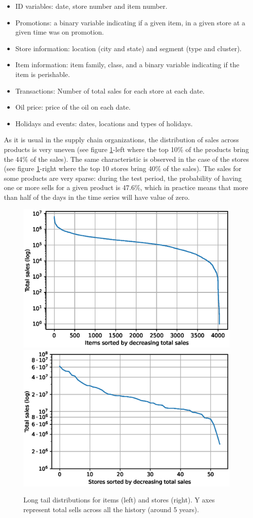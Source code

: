\documentclass{elsarticle}
\begin{document}
	\begin{itemize}
		\item ID variables: date, store number and item number.
		\item Promotions: a binary variable indicating if a given item, in a given store at a given time was on promotion.
		\item Store information: location (city and state) and segment (type and cluster).
		\item Item information: item family, class, and a binary variable indicating if the item is perishable.
		\item Transactions: Number of total sales for each store at each date.
		\item Oil price: price of the oil on each date.
		\item Holidays and events: dates, locations and types of holidays.
	\end{itemize}
	
	As it is usual in the supply chain organizations, the distribution of sales across products is very uneven (see figure \ref{fig:tails}-left where the top 10\% of the products bring the 44\% of the sales). The same characteristic is observed in the case of the stores (see figure \ref{fig:tails}-right where the top 10 stores bring 40\% of the sales). The sales for some products are very sparse: during the test period, the probability of having one or more sells for a given product is 47.6\%, which in practice means that more than half of the days in the time series will have value of zero.
	
	\begin{figure}
		\centering
		\includegraphics[width=0.48\linewidth]{img/items_tail_log}
		\includegraphics[width=0.48\linewidth]{img/stores_tail_log}
		\caption{Long tail distributions for items (left) and stores (right). Y axes represent total sells across all the history (around 5 years).}
		\label{fig:tails}
	\end{figure}
	
\end{document}
